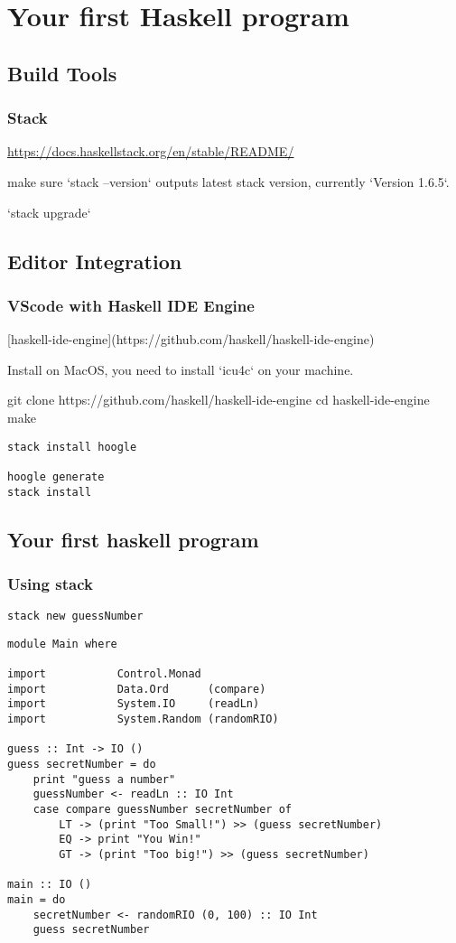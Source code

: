 \chapter{Your first Haskell program}

\section{Build Tools}
\subsection{Stack}

\url{https://docs.haskellstack.org/en/stable/README/}

make sure `stack --version` outputs latest stack version, currently `Version 1.6.5`.

`stack upgrade`
\section{Editor Integration}
\subsection{VScode with Haskell IDE Engine}
[haskell-ide-engine](https://github.com/haskell/haskell-ide-engine)

Install on MacOS, you need to install `icu4c` on your machine.

git clone https://github.com/haskell/haskell-ide-engine
cd haskell-ide-engine
make



\begin{verbatim}
stack install hoogle

hoogle generate
stack install
\end{verbatim}


\section{Your first haskell program}
\subsection{Using stack}
\verb|stack new guessNumber|

\begin{verbatim}
module Main where

import           Control.Monad
import           Data.Ord      (compare)
import           System.IO     (readLn)
import           System.Random (randomRIO)

guess :: Int -> IO ()
guess secretNumber = do
    print "guess a number"
    guessNumber <- readLn :: IO Int
    case compare guessNumber secretNumber of
        LT -> (print "Too Small!") >> (guess secretNumber)
        EQ -> print "You Win!"
        GT -> (print "Too big!") >> (guess secretNumber)

main :: IO ()
main = do
    secretNumber <- randomRIO (0, 100) :: IO Int
    guess secretNumber
\end{verbatim}
